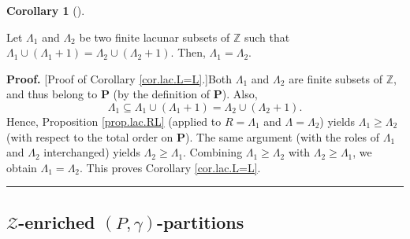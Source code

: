 \documentclass[numbers=enddot,12pt,final,onecolumn,notitlepage]{scrartcl}%
\theoremstyle{definition}
\newtheorem{coro}[theo]{Corollary}
\newenvironment{corollary}[1][]
{\begin{coro}[#1]\begin{leftbar}}
{\end{leftbar}\end{coro}}
\newenvironment{proof}[1][Proof]{\noindent\textbf{#1.} }{\ \rule{0.5em}{0.5em}}
\newenvironment{verlong}{}{}
\newenvironment{vershort}{}{}
\begin{document}
\begin{verlong}
\begin{corollary}
\label{cor.lac.L=L}Let $\Lambda_{1}$ and $\Lambda_{2}$ be two finite lacunar
subsets of $\mathbb{Z}$ such that $\Lambda_{1}\cup\left(  \Lambda
_{1}+1\right)  =\Lambda_{2}\cup\left(  \Lambda_{2}+1\right)  $. Then,
$\Lambda_{1}=\Lambda_{2}$.
\end{corollary}


\begin{proof}
[Proof of Corollary \ref{cor.lac.L=L}.]Both $\Lambda_{1}$ and $\Lambda_{2}$
are finite subsets of $\mathbb{Z}$, and thus belong to $\mathbf{P}$ (by the
definition of $\mathbf{P}$). Also,
\[
\Lambda_{1}\subseteq\Lambda_{1}\cup\left(  \Lambda_{1}+1\right)  =\Lambda
_{2}\cup\left(  \Lambda_{2}+1\right)  .
\]
Hence, Proposition \ref{prop.lac.RL} (applied to $R=\Lambda_{1}$ and
$\Lambda=\Lambda_{2}$) yields $\Lambda_{1}\geq\Lambda_{2}$ (with respect to
the total order on $\mathbf{P}$). The same argument (with the roles of
$\Lambda_{1}$ and $\Lambda_{2}$ interchanged) yields $\Lambda_{2}\geq
\Lambda_{1}$. Combining $\Lambda_{1}\geq\Lambda_{2}$ with $\Lambda_{2}%
\geq\Lambda_{1}$, we obtain $\Lambda_{1}=\Lambda_{2}$. This proves Corollary
\ref{cor.lac.L=L}.
\end{proof}
\end{verlong}

\subsection{\label{subsect.Zenri.gen}$\mathcal{Z}$-enriched $\left(
P,\gamma\right)  $-partitions}
\end{document}
